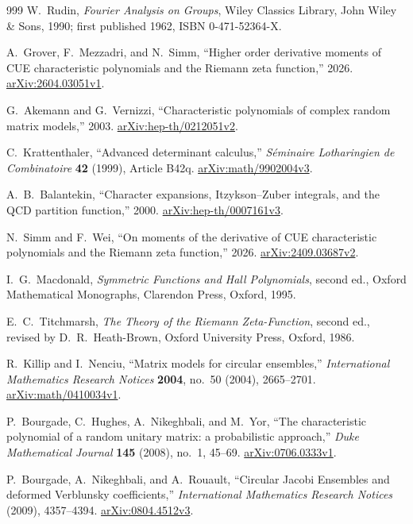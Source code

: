 \begin{thebibliography}{999}
W.~Rudin,
\emph{Fourier Analysis on Groups},
Wiley Classics Library, John Wiley \& Sons, 1990;
first published 1962, ISBN 0-471-52364-X.

A.~Grover, F.~Mezzadri, and N.~Simm,
``Higher order derivative moments of CUE characteristic polynomials and the Riemann zeta
function,'' 2026.
\href{https://arxiv.org/abs/2604.03051v1}{arXiv:2604.03051v1}.

G.~Akemann and G.~Vernizzi,
``Characteristic polynomials of complex random matrix models,'' 2003.
\href{https://arxiv.org/abs/hep-th/0212051v2}{arXiv:hep-th/0212051v2}.

C.~Krattenthaler,
``Advanced determinant calculus,''
\emph{S\'eminaire Lotharingien de Combinatoire} \textbf{42} (1999), Article B42q.
\href{https://arxiv.org/abs/math/9902004v3}{arXiv:math/9902004v3}.

A.~B.~Balantekin,
``Character expansions, Itzykson--Zuber integrals, and the QCD partition function,'' 2000.
\href{https://arxiv.org/abs/hep-th/0007161v3}{arXiv:hep-th/0007161v3}.

N.~Simm and F.~Wei,
``On moments of the derivative of CUE characteristic polynomials and the Riemann zeta
function,'' 2026.
\href{https://arxiv.org/abs/2409.03687v2}{arXiv:2409.03687v2}.

I.~G.~Macdonald,
\emph{Symmetric Functions and Hall Polynomials}, second ed.,
Oxford Mathematical Monographs, Clarendon Press, Oxford, 1995.

E.~C.~Titchmarsh,
\emph{The Theory of the Riemann Zeta-Function}, second ed., revised by D.~R.~Heath-Brown,
Oxford University Press, Oxford, 1986.

R.~Killip and I.~Nenciu,
``Matrix models for circular ensembles,''
\emph{International Mathematics Research Notices} \textbf{2004}, no.~50 (2004),
2665--2701.
\href{https://arxiv.org/abs/math/0410034v1}{arXiv:math/0410034v1}.

P.~Bourgade, C.~Hughes, A.~Nikeghbali, and M.~Yor,
``The characteristic polynomial of a random unitary matrix: a probabilistic approach,''
\emph{Duke Mathematical Journal} \textbf{145} (2008), no.~1, 45--69.
\href{https://arxiv.org/abs/0706.0333v1}{arXiv:0706.0333v1}.

P.~Bourgade, A.~Nikeghbali, and A.~Rouault,
``Circular Jacobi Ensembles and deformed Verblunsky coefficients,''
\emph{International Mathematics Research Notices} (2009), 4357--4394.
\href{https://arxiv.org/abs/0804.4512v3}{arXiv:0804.4512v3}.


\end{thebibliography}
